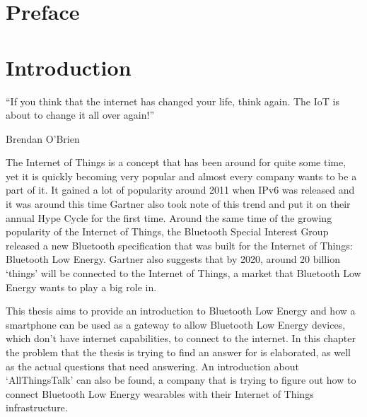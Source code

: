 \documentclass[pdftex,a4paper,12pt,twoside]{report}
\begin{document}
\begin{abstract}
\end{abstract}

\chapter*{Preface}
\label{ch:preface}


\tableofcontents



\chapter{Introduction}
\label{ch:introduction}
\epigraph{``If you think that the internet has changed your life, think again. The IoT is about to change it all over again!''}{Brendan O'Brien}
The Internet of Things is a concept that has been around for quite some time, yet it is quickly becoming very popular and almost every company wants to be a part of it. It gained a lot of popularity around 2011 when IPv6 was released and it was around this time Gartner \citep{gartner2012} also took note of this trend and put it on their annual Hype Cycle for the first time. Around the same time of the growing popularity of the Internet of Things, the Bluetooth Special Interest Group released a new Bluetooth specification that was built for the Internet of Things: Bluetooth Low Energy. Gartner \citep{gartner2015} also suggests that by 2020, around 20 billion `things' will be connected to the Internet of Things, a market that Bluetooth Low Energy wants to play a big role in.

This thesis aims to provide an introduction to Bluetooth Low Energy and how a smartphone can be used as a gateway to allow Bluetooth Low Energy devices, which don't have internet capabilities, to connect to the internet. In this chapter the problem that the thesis is trying to find an answer for is elaborated, as well as the actual questions that need answering. An introduction about `AllThingsTalk' can also be found, a company that is trying to figure out how to connect Bluetooth Low Energy wearables with their Internet of Things infrastructure.
\end{document}
